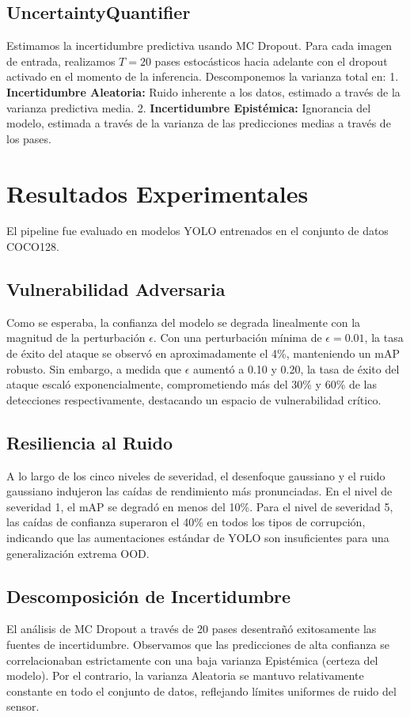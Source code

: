 \documentclass[conference]{IEEEtran}
\begin{document}
\subsection{UncertaintyQuantifier}
Estimamos la incertidumbre predictiva usando MC Dropout. Para cada imagen de entrada, realizamos $T=20$ pases estocásticos hacia adelante con el dropout activado en el momento de la inferencia. Descomponemos la varianza total en:
1. \textbf{Incertidumbre Aleatoria:} Ruido inherente a los datos, estimado a través de la varianza predictiva media.
2. \textbf{Incertidumbre Epistémica:} Ignorancia del modelo, estimada a través de la varianza de las predicciones medias a través de los pases.

\section{Resultados Experimentales}
El pipeline fue evaluado en modelos YOLO entrenados en el conjunto de datos COCO128.

\subsection{Vulnerabilidad Adversaria}
Como se esperaba, la confianza del modelo se degrada linealmente con la magnitud de la perturbación $\epsilon$. Con una perturbación mínima de $\epsilon=0.01$, la tasa de éxito del ataque se observó en aproximadamente el 4\%, manteniendo un mAP robusto. Sin embargo, a medida que $\epsilon$ aumentó a 0.10 y 0.20, la tasa de éxito del ataque escaló exponencialmente, comprometiendo más del 30\% y 60\% de las detecciones respectivamente, destacando un espacio de vulnerabilidad crítico.

\subsection{Resiliencia al Ruido}
A lo largo de los cinco niveles de severidad, el desenfoque gaussiano y el ruido gaussiano indujeron las caídas de rendimiento más pronunciadas. En el nivel de severidad 1, el mAP se degradó en menos del 10\%. Para el nivel de severidad 5, las caídas de confianza superaron el 40\% en todos los tipos de corrupción, indicando que las aumentaciones estándar de YOLO son insuficientes para una generalización extrema OOD.

\subsection{Descomposición de Incertidumbre}
El análisis de MC Dropout a través de 20 pases desentrañó exitosamente las fuentes de incertidumbre. Observamos que las predicciones de alta confianza se correlacionaban estrictamente con una baja varianza Epistémica (certeza del modelo). Por el contrario, la varianza Aleatoria se mantuvo relativamente constante en todo el conjunto de datos, reflejando límites uniformes de ruido del sensor.
\end{document}
